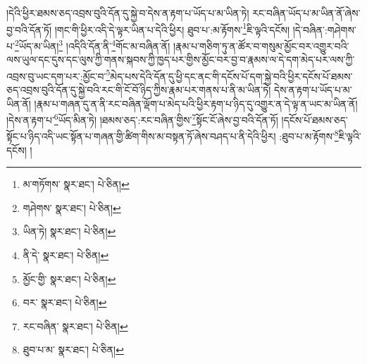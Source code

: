 །དེའི་ཕྱིར་ཐམས་ཅད་འབྲས་བུའི་དོན་དུ་སྐྱེ་བ་དེས་ན་རྟག་པ་ཡོད་པ་མ་ཡིན་ཏེ། རང་བཞིན་ཡོད་པ་མ་ཡིན་ནོ་ཞེས་བྱ་བའི་དོན་ཏོ། །གང་གི་ཕྱིར་འདི་དེ་ལྟར་ཡིན་པ་དེའི་ཕྱིར། ཐུབ་པ་:མ་རྟོགས་\footnote{མ་གཏོགས་  སྣར་ཐང་།  པེ་ཅིན། }ཇི་ལྟའི་དངོས། །དེ་བཞིན་:གཤེགས་པ་\footnote{གཤེགས་  སྣར་ཐང་།  པེ་ཅིན། }ཡོད་མ་ཡིན།\footnote{ཡིན་ཏེ།  སྣར་ཐང་།  པེ་ཅིན། } །འདིའི་དོན་ནི་\footnote{ནི་དེ་  སྣར་ཐང་།  པེ་ཅིན། }གོང་མ་བཞིན་ནོ། །རྣམ་པ་གཅིག་ཏུ་ན་ཚོར་བ་གསུམ་མྱོང་བར་འགྱུར་བའི་ལས་ཡུལ་དང་དུས་དང་ལུས་ཀྱི་གནས་སྐབས་ཀྱི་ཁྱད་པར་གྱིས་མྱོང་བར་བྱ་བ་རྣམས་ལ་དེ་དག་མེད་པར་ལས་ཀྱི་འབྲས་བུ་ཡང་དག་པར་:མྱོང་བ་\footnote{མྱོང་གྱི་  སྣར་ཐང་།  པེ་ཅིན། }མེད་པས་དེའི་དོན་དུ་ཕྱི་དང་ནང་གི་དངོས་པོ་དག་སྐྱེ་བའི་ཕྱིར་དངོས་པོ་ཐམས་ཅད་འབྲས་བུའི་དོན་དུ་སྐྱེ་བའི་རང་གི་ངོ་བོ་ཉིད་ཀྱིས་རྣམ་པར་གནས་པ་ནི་མ་ཡིན་ཏེ། དེས་ན་རྟག་པ་ཡོད་པ་མ་ཡིན་ནོ། །རྣམ་པ་གཞན་དུ་ན་ནི་རང་བཞིན་ལྡོག་པ་མེད་པའི་ཕྱིར་རྟག་པ་ཉིད་དུ་འགྱུར་ན་དེ་ལྟ་ན་ཡང་མ་ཡིན་ནོ། །དེས་ན་རྟག་པ་\footnote{བར་  སྣར་ཐང་།  པེ་ཅིན། }ཡོད་མིན་ཏེ། །ཐམས་ཅད་:རང་བཞིན་གྱིས་\footnote{རང་བཞིན་  སྣར་ཐང་།  པེ་ཅིན། }སྟོང་ངོ་ཞེས་བྱ་བའི་དོན་ཏོ། །དངོས་པོ་ཐམས་ཅད་སྟོང་པ་ཉིད་འདི་ཡང་སྟོན་པ་གཞན་གྱི་ཚིག་གིས་མ་བསྟན་ཏོ་ཞེས་བཤད་པ་ནི་དེའི་ཕྱིར། :ཐུབ་པ་མ་རྟོགས་\footnote{ཐུབ་པ་མ་  སྣར་ཐང་།  པེ་ཅིན། }ཇི་ལྟའི་དངོས། །
